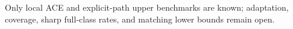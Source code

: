 Only local ACE and explicit-path upper benchmarks are known; adaptation, coverage, sharp full-class rates, and matching lower bounds remain open.